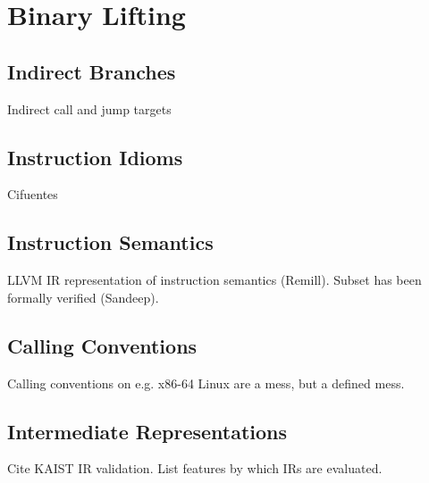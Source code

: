 
\section{Binary Lifting}


\subsection{Indirect Branches}

Indirect call and jump targets


\subsection{Instruction Idioms}

Cifuentes


\subsection{Instruction Semantics}

LLVM IR representation of instruction semantics (Remill). Subset has been formally verified (Sandeep).


\subsection{Calling Conventions}

Calling conventions on e.g. x86-64 Linux are a mess, but a defined mess.


\subsection{Intermediate Representations}

Cite KAIST IR validation. List features by which IRs are evaluated.

